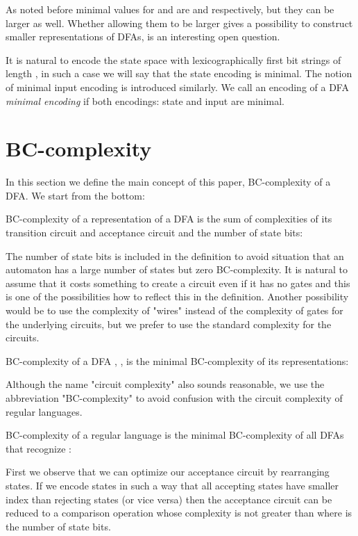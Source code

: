 \documentclass[copyright, creativecommons]{eptcs}
\newenvironment{definition}[1][Definition]{\begin{trivlist}
\item[\hskip \labelsep {\bfseries #1}]}{\end{trivlist}}
\begin{document}
As noted before minimal values for  and  are 
and  respectively,
but they can be larger as well.
Whether allowing them to be larger gives a possibility to construct smaller representations of DFAs,
is an interesting open question.

It is natural to encode the state space  with  lexicographically first bit strings 
of length , in such a case we will say that the state encoding is minimal.
The notion of minimal input encoding is introduced similarly.
We call an encoding of a DFA \textit{minimal encoding} if both encodings: state and input are minimal.


\section{BC-complexity}
\label{4nod}
In this section we define the main concept of this paper, BC-complexity of a DFA.
We start from the bottom:
\begin{definition}
BC-complexity of a representation of a DFA  is the sum of complexities
of its transition circuit and acceptance circuit and the number of state bits:

\end{definition}

The number of state bits  is included in the definition to avoid situation that an automaton
has a large number of states but zero BC-complexity. It is natural to assume that it costs something
to create a circuit even if it has no gates and this is one of the possibilities how to reflect
this in the definition. Another possibility would be to use the complexity of "wires"
instead of the complexity of gates for the underlying circuits, but we prefer to use the standard
complexity for the circuits.


\begin{definition}
BC-complexity of a DFA ,
, is the minimal BC-complexity of its representations:

\end{definition}

Although the name "circuit complexity" also sounds reasonable,
we use the abbreviation "BC-complexity" to avoid confusion
with the circuit complexity of regular languages.
\begin{definition}
BC-complexity of a regular language  is the minimal BC-complexity of all DFAs
that recognize :

\end{definition}


First we observe that we can optimize our acceptance circuit by rearranging states. If we encode states
in such a way that all accepting states have smaller index than rejecting states (or vice versa) then the acceptance circuit
can be reduced to a comparison operation whose complexity is not greater than  where  is the number of state bits. 
\end{document}
